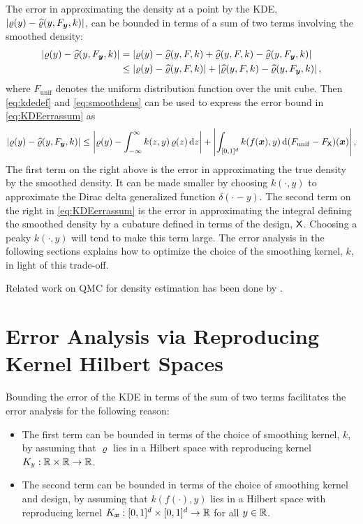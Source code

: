 \documentclass[letterpaper]{amsart}
\newcommand{\hvarrho}{\widehat{\varrho}}
\newcommand{\KY}{K_y}
\newcommand{\KX}{{K_{\vx}}}
\begin{document}
The error in approximating the density at a point by the KDE, $\abs{\varrho(y) - \hvarrho(y,F_{\vy},k)}$, can be bounded in terms of a sum of two terms involving the smoothed density:
\begin{align}
	\label{eq:KDEerrassum}
	\abs{\varrho(y) - \hvarrho(y,F_{\vy},k)} & =
	\abs{\varrho(y) - \hvarrho(y,F,k) + \hvarrho(y,F,k) - \hvarrho(y,F_{\vy},k)} \\
	\nonumber
	& \le  \abs{\varrho(y) - \hvarrho(y,F,k)} + \abs{\hvarrho(y,F,k) - \hvarrho(y,F_{\vy},k)},
\end{align}
where $F_{\mathrm{unif}}$ denotes the uniform distribution function over the unit cube.  Then \eqref{eq:kdedef} and \eqref{eq:smoothdens} can be used to express the error bound in \eqref{eq:KDEerrassum} as
\begin{equation}
	\label{eq:KDEerrassumA}
	\abs{\varrho(y) - \hvarrho(y,F_{\vy},k)} \le \abs{\varrho(y) - \int_{-\infty}^{\infty} k(z,y) \, \varrho(z) \, \dif z } + \abs{\int_{[0,1]^d} k(f(\vx),y) \,  \dif (F_{\mathrm{unif}} - F_{\mX})(\vx)},
\end{equation}
The first term on the right above is the error in approximating the true density by the smoothed density.  It can be made smaller by choosing $k(\cdot,y)$ to approximate the Dirac delta generalized function $\delta(\cdot - y)$.  The second term on the right in  \eqref{eq:KDEerrassum} is the error in approximating the integral defining the smoothed density by a cubature defined in terms of the design, $\mathsf{X}$.  Choosing a peaky $k(\cdot,y)$  will tend to make this term large.  The error analysis in the following sections explains how to optimize the choice of the smoothing kernel, $k$, in light of this trade-off.

Related work on QMC for density estimation has been done by \cite{AbdEtal21a,GilKuoSlo23a,LEcPuc20a,LEcuyer2022b}.

\section{Error Analysis via Reproducing Kernel Hilbert Spaces}\label{sec:error_analysis}
Bounding the error of the KDE in terms of the sum of two terms facilitates the error analysis for the following reason:
\begin{itemize}
	\item The first term can be bounded in terms of the choice of smoothing kernel, $k$, by assuming that $\varrho$ lies in a Hilbert space with reproducing kernel $\KY:\reals \times \reals \to \reals$.

	\item The second term can be bounded in terms of the choice of smoothing kernel and design, by assuming that $k(f(\cdot),y)$  lies in a Hilbert space with reproducing kernel $\KX: [0,1]^d \times [0,1]^d\to \reals$ for all $y \in \mathbb{R}$.
\end{itemize}
\end{document}
